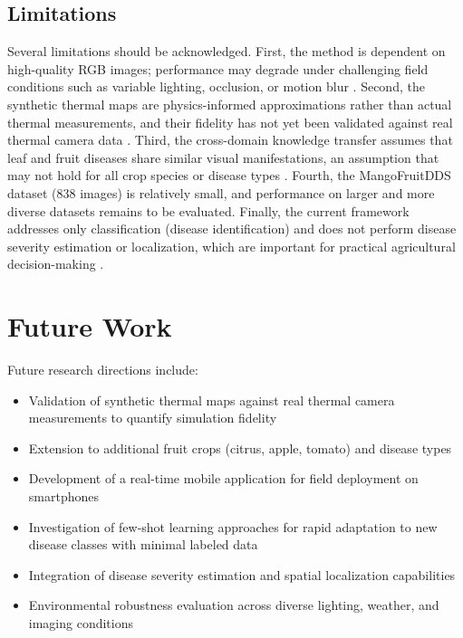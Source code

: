 \documentclass[utf8]{FrontiersinHarvard} %
\begin{document}
\subsection{Limitations}
Several limitations should be acknowledged. First, the method is dependent on high-quality RGB images; performance may degrade under challenging field conditions such as variable lighting, occlusion, or motion blur \cite{kouidri2021}. Second, the synthetic thermal maps are physics-informed approximations rather than actual thermal measurements, and their fidelity has not yet been validated against real thermal camera data \cite{zhai2020}. Third, the cross-domain knowledge transfer assumes that leaf and fruit diseases share similar visual manifestations, an assumption that may not hold for all crop species or disease types \cite{weiss2016}. Fourth, the MangoFruitDDS dataset (838 images) is relatively small, and performance on larger and more diverse datasets remains to be evaluated. Finally, the current framework addresses only classification (disease identification) and does not perform disease severity estimation or localization, which are important for practical agricultural decision-making \cite{wang2022_synthetic}.

\section{Future Work}
Future research directions include:
\begin{itemize}
    \item Validation of synthetic thermal maps against real thermal camera measurements to quantify simulation fidelity
    \item Extension to additional fruit crops (citrus, apple, tomato) and disease types
    \item Development of a real-time mobile application for field deployment on smartphones
    \item Investigation of few-shot learning approaches for rapid adaptation to new disease classes with minimal labeled data
    \item Integration of disease severity estimation and spatial localization capabilities
    \item Environmental robustness evaluation across diverse lighting, weather, and imaging conditions
\end{itemize}

\FloatBarrier
\end{document}
